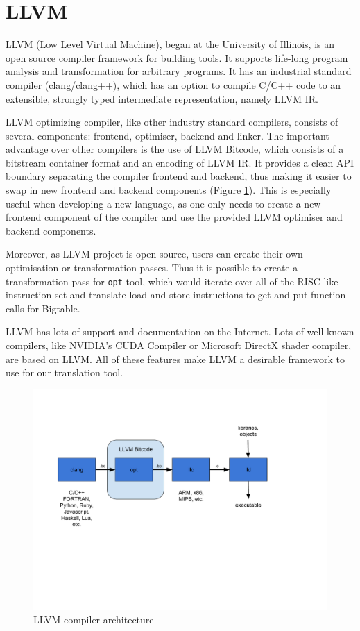 \documentclass[bsc,frontabs,twoside,singlespacing,parskip,deptreport]{infthesis}     %
\begin{document}
\section{LLVM}

LLVM (Low Level Virtual Machine), began at the University of Illinois, is an open source compiler framework for building tools. It supports life-long program analysis and transformation for arbitrary programs. It has an industrial standard compiler (clang/clang++), which has an option to compile C/C++ code to an extensible, strongly typed intermediate representation, namely LLVM IR.

LLVM optimizing compiler, like other industry standard compilers, consists of several components: frontend, optimiser, backend and linker. The important advantage over other compilers is the use of LLVM Bitcode, which consists of a bitstream container format and an encoding of LLVM IR. It provides a clean API boundary separating the compiler frontend and backend, thus making it easier to swap in new frontend and backend components (Figure \ref{fig:llvm}). This is especially useful when developing a new language, as one only needs to create a new frontend component of the compiler and use the provided LLVM optimiser and backend components. 

Moreover, as LLVM project is open-source, users can create their own optimisation or transformation passes. Thus it is possible to create a transformation pass for \texttt{opt} tool, which would iterate over all of the RISC-like instruction set and translate load and store instructions to get and put function calls for Bigtable.

LLVM has lots of support and documentation on the Internet. Lots of well-known compilers, like NVIDIA's CUDA Compiler or Microsoft DirectX shader compiler, are based on LLVM. All of these features make LLVM a desirable framework to use for our translation tool.

\begin{figure}[H]
\centering
\includegraphics[width=1\textwidth]{images/llvm}
\caption{LLVM compiler architecture}
\label{fig:llvm}
\end{figure}
\end{document}
